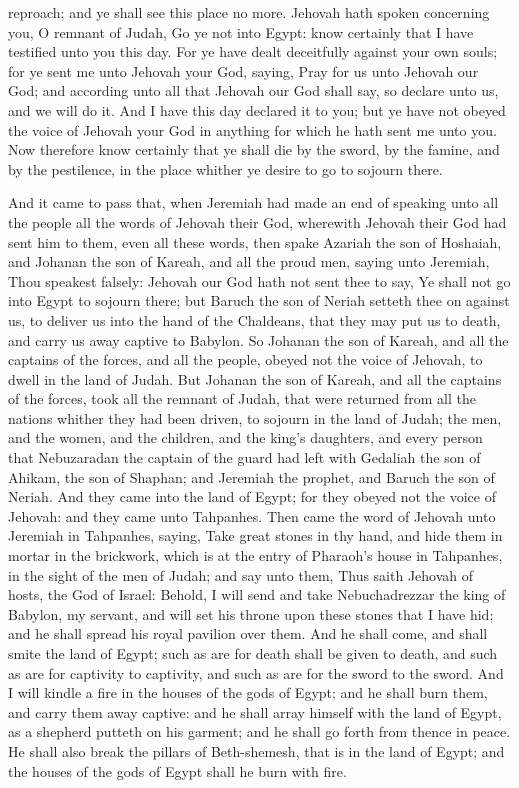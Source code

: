 reproach; and ye shall see this place no more. Jehovah hath spoken concerning you, O remnant of Judah, Go ye not into Egypt: know certainly that I have testified unto you this day. For ye have dealt deceitfully against your own souls; for ye sent me unto Jehovah your God, saying, Pray for us unto Jehovah our God; and according unto all that Jehovah our God shall say, so declare unto us, and we will do it. And I have this day declared it to you; but ye have not obeyed the voice of Jehovah your God in anything for which he hath sent me unto you. Now therefore know certainly that ye shall die by the sword, by the famine, and by the pestilence, in the place whither ye desire to go to sojourn there. 

And it came to pass that, when Jeremiah had made an end of speaking unto all the people all the words of Jehovah their God, wherewith Jehovah their God had sent him to them, even all these words, then spake Azariah the son of Hoshaiah, and Johanan the son of Kareah, and all the proud men, saying unto Jeremiah, Thou speakest falsely: Jehovah our God hath not sent thee to say, Ye shall not go into Egypt to sojourn there; but Baruch the son of Neriah setteth thee on against us, to deliver us into the hand of the Chaldeans, that they may put us to death, and carry us away captive to Babylon. So Johanan the son of Kareah, and all the captains of the forces, and all the people, obeyed not the voice of Jehovah, to dwell in the land of Judah. But Johanan the son of Kareah, and all the captains of the forces, took all the remnant of Judah, that were returned from all the nations whither they had been driven, to sojourn in the land of Judah; the men, and the women, and the children, and the king’s daughters, and every person that Nebuzaradan the captain of the guard had left with Gedaliah the son of Ahikam, the son of Shaphan; and Jeremiah the prophet, and Baruch the son of Neriah. And they came into the land of Egypt; for they obeyed not the voice of Jehovah: and they came unto Tahpanhes.  Then came the word of Jehovah unto Jeremiah in Tahpanhes, saying, Take great stones in thy hand, and hide them in mortar in the brickwork, which is at the entry of Pharaoh’s house in Tahpanhes, in the sight of the men of Judah; and say unto them, Thus saith Jehovah of hosts, the God of Israel: Behold, I will send and take Nebuchadrezzar the king of Babylon, my servant, and will set his throne upon these stones that I have hid; and he shall spread his royal pavilion over them. And he shall come, and shall smite the land of Egypt; such as are for death shall be given to death, and such as are for captivity to captivity, and such as are for the sword to the sword. And I will kindle a fire in the houses of the gods of Egypt; and he shall burn them, and carry them away captive: and he shall array himself with the land of Egypt, as a shepherd putteth on his garment; and he shall go forth from thence in peace. He shall also break the pillars of Beth-shemesh, that is in the land of Egypt; and the houses of the gods of Egypt shall he burn with fire. 

